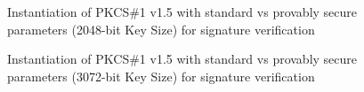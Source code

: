 \documentclass[]{final_report}
\theoremstyle{definition}
\begin{document}
\begin{figure}[H]
    \centering %
     \caption{Instantiation of PKCS\#1 v1.5 with standard vs provably secure parameters (2048-bit Key Size) for signature verification}
    \begin{minipage}{\textwidth}
        \centering
    \end{minipage}
           \label{pkcs_verify_2048bit_table}
  \end{figure}
  
\begin{figure}[H]
    \centering %
     \caption{Instantiation of PKCS\#1 v1.5 with standard vs provably secure parameters (3072-bit Key Size) for signature verification}
    \begin{minipage}{\textwidth}
        \centering
    \end{minipage}
          \label{pkcs_verify_3072bit_table}
\end{figure}
\end{document}
